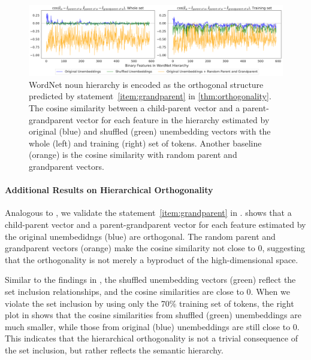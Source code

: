 \documentclass{article}
\begin{document}
\begin{figure}[t]
  \centering
  \includegraphics[width=1.0\linewidth]{figures/hier_ortho_e_noun_gemma.pdf}
  \caption{WordNet noun hierarchy is encoded as the orthogonal structure predicted by statement~\ref{item:grandparent} in \cref{thm:orthogonality}.
  The cosine similarity between a child-parent vector and a parent-grandparent vector for each feature in the hierarchy estimated by original (blue) and shuffled (green) unembedding vectors with the whole (left) and training (right) set of tokens.
  Another baseline (orange) is the cosine similarity with random parent and grandparent vectors.
  }
  \label{fig:hier_ortho_e_noun_gemma}
\end{figure}

\paragraph*{Additional Results on Hierarchical Orthogonality}
Analogous to , we validate the statement~\ref{item:grandparent} in .
 shows that a child-parent vector and a parent-grandparent vector for each feature estimated by the original unembedidngs (blue) are orthogonal.
The random parent and grandparent vectors (orange) make the cosine similarity not close to 0, suggesting that the orthogonality is not merely a byproduct of the high-dimensional space.

Similar to the findings in , the shuffled unembedding vectors (green) reflect the set inclusion relationships, and the cosine similarities are close to 0.
When we violate the set inclusion by using only the 70\% training set of tokens, the right plot in  shows that the cosine similarities from shuffled (green) unembeddings are much smaller, while those from original (blue) unembeddings are still close to 0.
This indicates that the hierarchical orthogonality is not a trivial consequence of the set inclusion, but rather reflects the semantic hierarchy.
\end{document}
